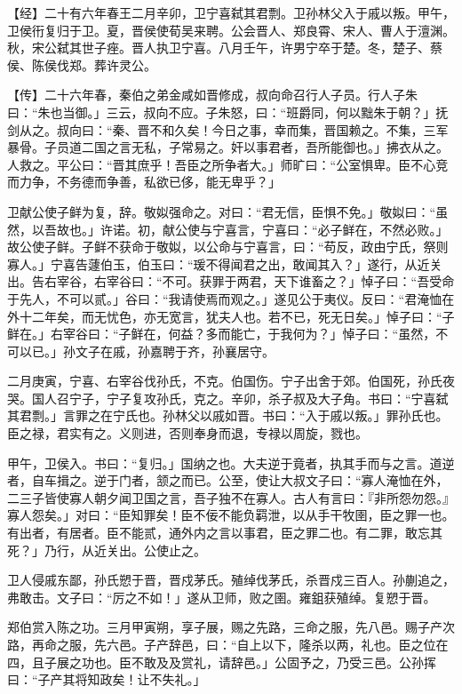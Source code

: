 \documentclass[]{article}
\begin{document}
【经】二十有六年春王二月辛卯，卫宁喜弑其君剽。卫孙林父入于戚以叛。甲午，卫侯衎复归于卫。夏，晋侯使荀吴来聘。公会晋人、郑良霄、宋人、曹人于澶渊。秋，宋公弑其世子痤。晋人执卫宁喜。八月壬午，许男宁卒于楚。冬，楚子、蔡侯、陈侯伐郑。葬许灵公。

【传】二十六年春，秦伯之弟金咸如晋修成，叔向命召行人子员。行人子朱曰：``朱也当御。」三云，叔向不应。子朱怒，曰：``班爵同，何以黜朱于朝？」抚剑从之。叔向曰：``秦、晋不和久矣！今日之事，幸而集，晋国赖之。不集，三军暴骨。子员道二国之言无私，子常易之。奸以事君者，吾所能御也。」拂衣从之。人救之。平公曰：``晋其庶乎！吾臣之所争者大。」师旷曰：``公室惧卑。臣不心竞而力争，不务德而争善，私欲已侈，能无卑乎？」

卫献公使子鲜为复，辞。敬姒强命之。对曰：``君无信，臣惧不免。」敬姒曰：``虽然，以吾故也。」许诺。初，献公使与宁喜言，宁喜曰：``必子鲜在，不然必败。」故公使子鲜。子鲜不获命于敬姒，以公命与宁喜言，曰：``苟反，政由宁氏，祭则寡人。」宁喜告蘧伯玉，伯玉曰：``瑗不得闻君之出，敢闻其入？」遂行，从近关出。告右宰谷，右宰谷曰：``不可。获罪于两君，天下谁畜之？」悼子曰：``吾受命于先人，不可以贰。」谷曰：``我请使焉而观之。」遂见公于夷仪。反曰：``君淹恤在外十二年矣，而无忧色，亦无宽言，犹夫人也。若不已，死无日矣。」悼子曰：``子鲜在。」右宰谷曰：``子鲜在，何益？多而能亡，于我何为？」悼子曰：``虽然，不可以已。」孙文子在戚，孙嘉聘于齐，孙襄居守。

二月庚寅，宁喜、右宰谷伐孙氏，不克。伯国伤。宁子出舍于郊。伯国死，孙氏夜哭。国人召宁子，宁子复攻孙氏，克之。辛卯，杀子叔及大子角。书曰：``宁喜弑其君剽。」言罪之在宁氏也。孙林父以戚如晋。书曰：``入于戚以叛。」罪孙氏也。臣之禄，君实有之。义则进，否则奉身而退，专禄以周旋，戮也。

甲午，卫侯入。书曰：``复归。」国纳之也。大夫逆于竟者，执其手而与之言。道逆者，自车揖之。逆于门者，颔之而已。公至，使让大叔文子曰：``寡人淹恤在外，二三子皆使寡人朝夕闻卫国之言，吾子独不在寡人。古人有言曰：『非所怨勿怨。』寡人怨矣。」对曰：``臣知罪矣！臣不佞不能负羁泄，以从手干牧圉，臣之罪一也。有出者，有居者。臣不能贰，通外内之言以事君，臣之罪二也。有二罪，敢忘其死？」乃行，从近关出。公使止之。

卫人侵戚东鄙，孙氏愬于晋，晋戍茅氏。殖绰伐茅氏，杀晋戍三百人。孙蒯追之，弗敢击。文子曰：``厉之不如！」遂从卫师，败之圉。雍鉏获殖绰。复愬于晋。

郑伯赏入陈之功。三月甲寅朔，享子展，赐之先路，三命之服，先八邑。赐子产次路，再命之服，先六邑。子产辞邑，曰：``自上以下，隆杀以两，礼也。臣之位在四，且子展之功也。臣不敢及及赏礼，请辞邑。」公固予之，乃受三邑。公孙挥曰：``子产其将知政矣！让不失礼。」
\end{document}
